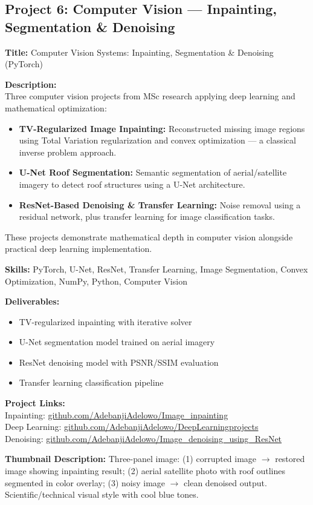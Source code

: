 \documentclass[11pt,a4paper]{article}
\newcommand{\projectentry}[1]{%
  \begin{mdframed}[backgroundcolor=LightGray, linecolor=VividPurple, linewidth=1pt,
    topline=false, bottomline=false, rightline=false,
    innerleftmargin=10pt, innerrightmargin=10pt, innertopmargin=8pt, innerbottommargin=8pt,
    skipabove=8pt, skipbelow=4pt]
  #1
  \end{mdframed}
}
\begin{document}
\subsection{Project 6: Computer Vision --- Inpainting, Segmentation \& Denoising}

\projectentry{
\textbf{\textcolor{VividPurple}{Title:}} Computer Vision Systems: Inpainting, Segmentation \& Denoising (PyTorch)

\medskip
\textbf{\textcolor{VividPurple}{Description:}}\\
Three computer vision projects from MSc research applying deep learning and mathematical optimization:
\begin{itemize}
  \item \textbf{TV-Regularized Image Inpainting:} Reconstructed missing image regions using Total Variation regularization and convex optimization --- a classical inverse problem approach.
  \item \textbf{U-Net Roof Segmentation:} Semantic segmentation of aerial/satellite imagery to detect roof structures using a U-Net architecture.
  \item \textbf{ResNet-Based Denoising \& Transfer Learning:} Noise removal using a residual network, plus transfer learning for image classification tasks.
\end{itemize}
These projects demonstrate mathematical depth in computer vision alongside practical deep learning implementation.

\medskip
\textbf{\textcolor{VividPurple}{Skills:}} PyTorch, U-Net, ResNet, Transfer Learning, Image Segmentation, Convex Optimization, NumPy, Python, Computer Vision

\medskip
\textbf{\textcolor{VividPurple}{Deliverables:}}
\begin{itemize}
  \item TV-regularized inpainting with iterative solver
  \item U-Net segmentation model trained on aerial imagery
  \item ResNet denoising model with PSNR/SSIM evaluation
  \item Transfer learning classification pipeline
\end{itemize}

\textbf{\textcolor{VividPurple}{Project Links:}}\\
Inpainting: \href{https://github.com/AdebanjiAdelowo/Image_inpainting}{github.com/AdebanjiAdelowo/Image\_inpainting}\\
Deep Learning: \href{https://github.com/AdebanjiAdelowo/DeepLearningprojects}{github.com/AdebanjiAdelowo/DeepLearningprojects}\\
Denoising: \href{https://github.com/AdebanjiAdelowo/Image_denoising_using_ResNet}{github.com/AdebanjiAdelowo/Image\_denoising\_using\_ResNet}

\medskip
\textbf{\textcolor{VividPurple}{Thumbnail Description:}} Three-panel image: (1) corrupted image $\rightarrow$ restored image showing inpainting result; (2) aerial satellite photo with roof outlines segmented in color overlay; (3) noisy image $\rightarrow$ clean denoised output. Scientific/technical visual style with cool blue tones.
}
\end{document}

